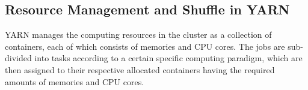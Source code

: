 \documentclass[10pt,journal,compsoc]{IEEEtran}
\begin{document}
\subsection{Resource Management and Shuffle in YARN}


YARN manages the computing resources in the cluster as a collection
of containers, each of which consists of memories and CPU cores. The
jobs are sub-divided into tasks according to a certain specific
computing paradigm, which are then assigned to their respective allocated
containers
having the required amounts of memories and CPU cores.
 
\end{document}
